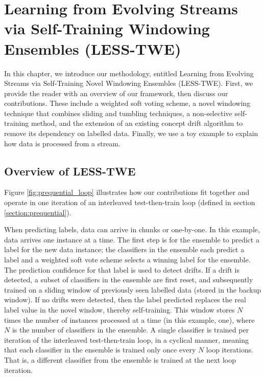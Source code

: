 \chapter{Learning from Evolving Streams via Self-Training Windowing Ensembles (LESS-TWE)\label{chapter:contributions}}%

In this chapter, we introduce our methodology, entitled Learning from Evolving Streams via Self-Training Novel Windowing Ensembles (LESS-TWE). First, we provide the reader with an overview of our framework, then discuss our contributions. These include a weighted soft voting scheme, a novel windowing technique that combines sliding and tumbling techniques, a non-selective self-training method, and the extension of an existing concept drift algorithm to remove its dependency on labelled data. Finally, we use a toy example to explain how data is processed from a stream.

\section{Overview of LESS-TWE}
Figure \ref{fig:prequential_loop} illustrates how our contributions fit together and operate in one iteration of an interleaved test-then-train loop (defined in section \ref{section:prequential}).

When predicting labels, data can arrive in chunks or one-by-one. In this example, data arrives one instance at a time. The first step is for the ensemble to predict a label for the new data instance; the classifiers in the ensemble each predict a label and a weighted soft vote scheme selects a winning label for the ensemble. The prediction confidence for that label is used to detect drifts. If a drift is detected, a subset of classifiers in the ensemble are first reset, and subsequently trained on a sliding window of previously seen labelled data (stored in the backup window). If no drifts were detected, then the label predicted replaces the real label value in the novel window, thereby self-training. This window stores $N$ times the number of instances processed at a time (in this example, one), where $N$ is the number of classifiers in the ensemble. A single classifier is trained per iteration of the interleaved test-then-train loop, in a cyclical manner, meaning that each classifier in the ensemble is trained only once every $N$ loop iterations. That is, a different classifier from the ensemble is trained at the next loop iteration.

